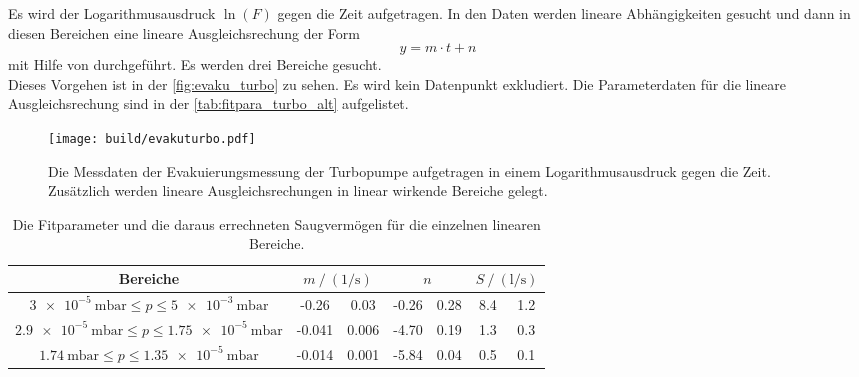     \noindent Es wird der Logarithmusausdruck $\ln(F)$ gegen die Zeit aufgetragen. In den Daten werden lineare Abhängigkeiten gesucht und dann in diesen Bereichen
    eine lineare Ausgleichsrechung der Form 
    \begin{equation*}
      y = m \cdot t + n
    \end{equation*}
    mit Hilfe von \cite{scipy} durchgeführt. Es werden drei Bereiche gesucht. \\
    Dieses Vorgehen ist in der \autoref{fig:evaku_turbo} zu sehen.
    Es wird kein Datenpunkt exkludiert. 
    Die Parameterdaten für die lineare Ausgleichsrechung sind in der \autoref{tab:fitpara_turbo_alt} aufgelistet. \\ 
    

    \begin{figure}[h]
      \centering
      \texttt{[image: build/evakuturbo.pdf]}
      \caption{Die Messdaten der Evakuierungsmessung der Turbopumpe aufgetragen in einem Logarithmusausdruck gegen die Zeit. Zusätzlich werden lineare Ausgleichsrechungen in linear wirkende Bereiche gelegt.}
      \label{fig:evaku_turbo}
    \end{figure}

    \begin{table}[h]
      \centering
      \caption{Die Fitparameter und die daraus errechneten Saugvermögen für die einzelnen linearen Bereiche.}
      \label{tab:fitpara_turbo_alt}
      \begin{tabular}{c S[table-format=2.3] @{${}\pm{}$} S[table-format=2.3] S @{${}\pm{}$} S[table-format=1.2] S[table-format=1.1] @{${}\pm{}$} S[table-format=1.1]}
        \toprule
        {Bereiche} &  &  & \\
        \midrule
        $\SI{3e-5}{\milli\bar} \leq p \leq \SI{5e-3}{\milli\bar}$   & -0.26  & 0.03  & -0.26 & 0.28 & 8.4 & 1.2 \\
        $\SI{2.9e-5}{\milli\bar} \leq p \leq \SI{1.75e-5}{\milli\bar}$ & -0.041 & 0.006 & -4.70 & 0.19 & 1.3 & 0.3 \\
        $\SI{1.74}{\milli\bar} \leq p \leq \SI{1.35e-5}{\milli\bar}$ & -0.014 & 0.001 & -5.84 & 0.04 & 0.5 & 0.1 \\
        \bottomrule
      \end{tabular}
    \end{table}


